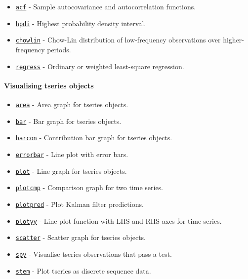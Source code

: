 \begin{itemize}
\itemsep1pt\parskip0pt
\item
  \href{tseries/acf}{\texttt{acf}} - Sample autocovariance and
  autocorrelation functions.
\item
  \href{tseries/hpdi}{\texttt{hpdi}} - Highest probability density
  interval.
\item
  \href{tseries/chowlin}{\texttt{chowlin}} - Chow-Lin distribution of
  low-frequency observations over higher-frequency periods.
\item
  \href{tseries/regress}{\texttt{regress}} - Ordinary or weighted
  least-square regression.
\end{itemize}

\paragraph{Visualising tseries
objects}\label{visualising-tseries-objects}

\begin{itemize}
\itemsep1pt\parskip0pt
\item
  \href{tseries/area}{\texttt{area}} - Area graph for tseries objects.
\item
  \href{tseries/bar}{\texttt{bar}} - Bar graph for tseries objects.
\item
  \href{tseries/barcon}{\texttt{barcon}} - Contribution bar graph for
  tseries objects.
\item
  \href{tseries/errorbar}{\texttt{errorbar}} - Line plot with error
  bars.
\item
  \href{tseries/plot}{\texttt{plot}} - Line graph for tseries objects.
\item
  \href{tseries/plotcmp}{\texttt{plotcmp}} - Comparison graph for two
  time series.
\item
  \href{tseries/plotpred}{\texttt{plotpred}} - Plot Kalman filter
  predictions.
\item
  \href{tseries/plotyy}{\texttt{plotyy}} - Line plot function with LHS
  and RHS axes for time series.
\item
  \href{tseries/scatter}{\texttt{scatter}} - Scatter graph for tseries
  objects.
\item
  \href{tseries/spy}{\texttt{spy}} - Visualise tseries observations that
  pass a test.
\item
  \href{tseries/stem}{\texttt{stem}} - Plot tseries as discrete sequence
  data.
\end{itemize}

